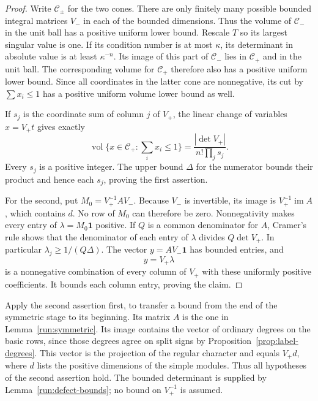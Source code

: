 \begin{proof}
Write \(\mathcal C_\pm\) for the two cones.
There are only finitely many possible bounded integral
matrices \(V_-\) in each of the bounded dimensions.
Thus the volume of \(\mathcal C_-\) in the unit ball has a
positive uniform lower bound.  Rescale \(T\) so its largest
singular value is one.  If its condition number is at most
\(\kappa\), its determinant in absolute value is at least
\(\kappa^{-n}\).  Its image of this part of
\(\mathcal C_-\) lies in \(\mathcal C_+\) and in the unit
ball.  The corresponding volume for \(\mathcal C_+\)
therefore also has a positive uniform lower bound.
Since all coordinates in the latter cone are nonnegative,
its cut by \(\sum x_i\leq1\) has a positive uniform
volume lower bound as well.

If \(s_j\) is the coordinate sum of column \(j\) of \(V_+\),
the linear change of variables \(x=V_+t\) gives exactly
\[
 \operatorname{vol}
 \{x\in\mathcal C_+:\textstyle\sum_i x_i\leq1\}
   =\frac{|\det V_+|}{n!\prod_j s_j}.
 \]
Every \(s_j\) is a positive integer.  The upper bound
\(\Delta\) for the numerator bounds their product and
hence each \(s_j\), proving the first assertion.

For the second, put \(M_0=V_+^{-1}AV_-\).
Because \(V_-\) is invertible, its image is
\(V_+^{-1}\operatorname{im}A\), which contains \(d\).
No row of \(M_0\) can therefore be zero.
Nonnegativity makes every entry of
\(\lambda=M_0\mathbf1\) positive.
If \(Q\) is a common denominator for \(A\), Cramer's rule
shows that the denominator of each entry of \(\lambda\)
divides \(Q\det V_+\).  In particular
\(\lambda_j\geq1/(Q\Delta)\).
The vector \(y=AV_-\mathbf1\) has bounded entries, and
\[
 y=V_+\lambda
 \]
is a nonnegative combination of every column of \(V_+\)
with these uniformly positive coefficients.  It bounds
each column entry, proving the claim.
\end{proof}

Apply the second assertion first, to transfer a bound from the
end of the symmetric stage to its beginning.  Its matrix \(A\)
is the one in Lemma~\ref{run:symmetric}.  Its image contains
the vector of ordinary degrees on the basic rows, since
those degrees agree on split signs by
Proposition~\ref{prop:label-degrees}.  This vector is the
projection of the regular character and equals
\(V_+d\), where \(d\) lists the positive dimensions of the
simple modules.  Thus all hypotheses of the second assertion
hold.  The bounded determinant is supplied by
Lemma~\ref{run:defect-bounds}; no bound on \(V_+^{-1}\)
is assumed.

